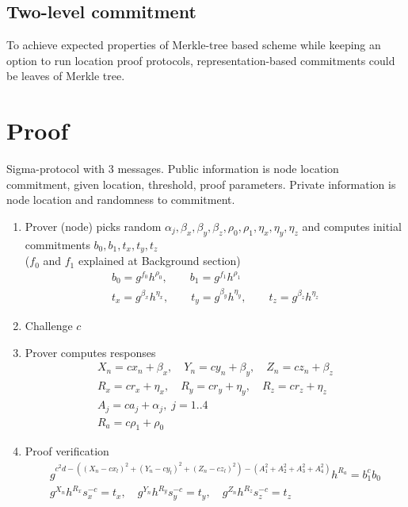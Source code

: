 \documentclass[a4paper,12pt]{article}
\begin{document}
\subsection{Two-level commitment}
To achieve expected properties of Merkle-tree based scheme while keeping an option
to run location proof protocols,
representation-based commitments could be leaves of Merkle tree.

\section{Proof}
\label{sect-close}
Sigma-protocol with 3 messages.
Public information is node location commitment, given location, threshold, proof parameters.
Private information is node location and randomness to commitment.

\begin{enumerate}
\item
  Prover (node) picks random $\alpha_j, \beta_x, \beta_y, \beta_z, \rho_0, \rho_1, \eta_x, \eta_y, \eta_z$
  and computes initial commitments $b_0, b_1, t_x, t_y, t_z$ \\
  ($f_0$ and $f_1$ explained at Background section)
\begin{gather}
  b_0 = g^{f_0} h^{\rho_0},   \qquad
  b_1 = g^{f_1} h^{\rho_1}    \\
  t_x = g^{\beta_x} h^{\eta_x},   \qquad
  t_y = g^{\beta_y} h^{\eta_y},   \qquad
  t_z = g^{\beta_z} h^{\eta_z}
\end{gather}

\item
  Challenge $c$
\item
  Prover computes responses
\begin{gather}
  X_n = c x_n + \beta_x,  \quad
  Y_n = c y_n + \beta_y,  \quad
  Z_n = c z_n + \beta_z   \\
  R_x = c r_x + \eta_x,   \quad
  R_y = c r_y + \eta_y,   \quad
  R_z = c r_z + \eta_z    \\
  A_j = c a_j + \alpha_j, \; j=1..4  \\
  R_a = c \rho_1 + \rho_0
\end{gather}

\item
  Proof verification
\begin{gather}
\label{verf-distn}
  g^{c^2 d - ((X_n - c x_l)^2 + (Y_n - c y_l)^2 + (Z_n - c z_l)^2 ) - (A_1^2 + A_2^2 + A_3^2 + A_4^2)} h^{R_a} = b_1^{c} b_0 \\
  g^{X_n} h^{R_x} s_x^{-c} = t_x,  \quad
  g^{Y_n} h^{R_y} s_y^{-c} = t_y,  \quad
  g^{Z_n} h^{R_z} s_z^{-c} = t_z
\end{gather}
  
\end{enumerate}
\end{document}
